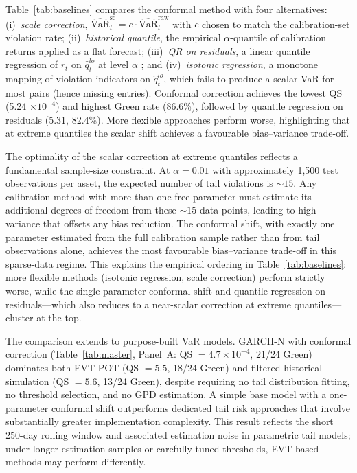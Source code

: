 \documentclass[preprint,11pt,authoryear]{elsarticle}
\newcommand{\VaR}{\mathrm{VaR}}
\newcommand{\1}{\boldsymbol{1}}
\begin{document}
	Table~\ref{tab:baselines} compares the conformal method with
	four alternatives: (i)~\emph{scale correction},
	$\widehat{\VaR}_t^{\mathrm{sc}} = c \cdot
	\widehat{\VaR}_t^{\mathrm{raw}}$ with $c$ chosen to match the
	calibration-set violation rate; (ii)~\emph{historical quantile},
	the empirical $\alpha$-quantile of calibration returns applied
	as a flat forecast; (iii)~\emph{QR on residuals}, a linear
	quantile regression of $r_t$ on $\hat{q}_t^{lo}$ at level
	$\alpha$ \citep[cf.][]{romano2019conformalized}; and
	(iv)~\emph{isotonic regression}, a monotone mapping of
	violation indicators on $\hat{q}_t^{lo}$, which fails to
	produce a scalar VaR for most pairs (hence missing entries).
	Conformal correction achieves the lowest QS
	(5.24 $\times 10^{-4}$) and highest Green rate (86.6\%),
	followed by quantile regression on residuals (5.31, 82.4\%).
	More flexible approaches perform worse, highlighting that at
	extreme quantiles the scalar shift achieves a favourable
	bias--variance trade-off.

	The optimality of the scalar correction at extreme quantiles
	reflects a fundamental sample-size constraint. At
	$\alpha = 0.01$ with approximately 1{,}500 test observations
	per asset, the expected number of tail violations is
	${\sim}15$. Any calibration method with more than one free
	parameter must estimate its additional degrees of freedom from
	these ${\sim}15$ data points, leading to high variance that
	offsets any bias reduction. The conformal shift, with exactly
	one parameter estimated from the full calibration sample rather
	than from tail observations alone, achieves the most favourable
	bias--variance trade-off in this sparse-data regime. This
	explains the empirical ordering in
	Table~\ref{tab:baselines}: more flexible methods (isotonic
	regression, scale correction) perform strictly worse, while the
	single-parameter conformal shift and quantile regression on
	residuals---which also reduces to a near-scalar correction at
	extreme quantiles---cluster at the top.

	The comparison extends to purpose-built VaR models. GARCH-N with
	conformal correction (Table~\ref{tab:master}, Panel~A:
	QS $= 4.7 \times 10^{-4}$, 21/24 Green) dominates both EVT-POT
	(QS $= 5.5$, 18/24 Green) and filtered historical simulation
	(QS $= 5.6$, 13/24 Green), despite requiring no tail
	distribution fitting, no threshold selection, and no GPD
	estimation. A simple base model with a one-parameter conformal
	shift outperforms dedicated tail risk approaches that involve
	substantially greater implementation complexity.
	This result reflects the short 250-day rolling window and associated estimation noise in parametric tail models; under longer estimation samples or carefully tuned thresholds, EVT-based methods may perform differently.
\end{document}
